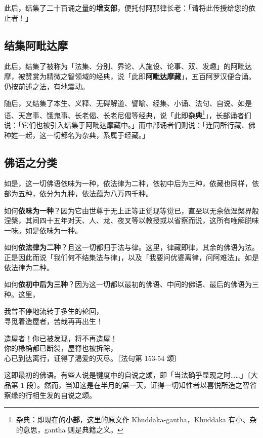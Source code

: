 此后，结集了二十百诵之量的\textbf{增支部}，便托付阿那律长老：「请将此传授给您的依止者！」

\subsection*{结集阿毗达摩}

此后，结集了被称为「法集、分别、界论、人施设、论事、双、发趣」的阿毗达摩，被赞赏为精微之智领域的经典，说「此即\textbf{阿毗达摩藏}」，五百阿罗汉便合诵。仍按前述之法，有地震动。

随后，又结集了本生、义释、无碍解道、譬喻、经集、小诵、法句、自说、如是语、天宫事、饿鬼事、长老偈、长老尼偈等经典，说「此即\textbf{杂典}\footnote{杂典：即现在的\textbf{小部}，这里的原文作 Khuddaka-gantha，Khuddaka 有小、杂的意思，gantha 则是典籍之义。}」，长部诵者们说：「它们也被引入结集于阿毗达摩藏中。」而中部诵者们则说：「连同所行藏、佛种姓一起，这一切都名为杂典，系属于经藏。」

\subsection*{佛语之分类}

如是，这一切佛语依味为一种，依法律为二种，依初中后为三种，依藏也同样，依部为五种，依分为九种，依法蕴为八万四千种。

如何\textbf{依味为一种}？因为它由世尊于无上正等正觉现等觉已，直至以无余依涅槃界般涅槃，其间四十五年对天、人、龙、夜叉等以教授或以省察而说，这所有唯解脱味一味。如是依味为一种。

如何\textbf{依法律为二种}？且这一切都归于法与律。这里，律藏即律，其余的佛语为法。正是因此而说「我们何不结集法与律」，以及「我要问优婆离律，问阿难法」。如是依法律为二种。

如何\textbf{依初中后为三种}？因为这一切都以最初的佛语、中间的佛语、最后的佛语为三种。这里，

\begin{quoting}我曾不停地流转于多生的轮回，\\寻觅着造屋者，苦哉再再出生！\end{quoting}

\begin{quoting}造屋者！你已被发现，将不再造屋！\\你的椽桷都已断裂，屋脊也被拆除，\\心已到达离行，证得了渴爱的灭尽。{\bluefootnotesize 〔法句第 153-54 颂〕}\end{quoting}

这即最初的佛语。有些人说是犍度中的自说之颂，即「当法确乎显现之时……」{\bluefootnotesize 〔大品第 1 段〕}。然而，当知这是在半月的第一天，证得一切知性者以喜悦所造之智省察缘的行相生发的自说之颂。

